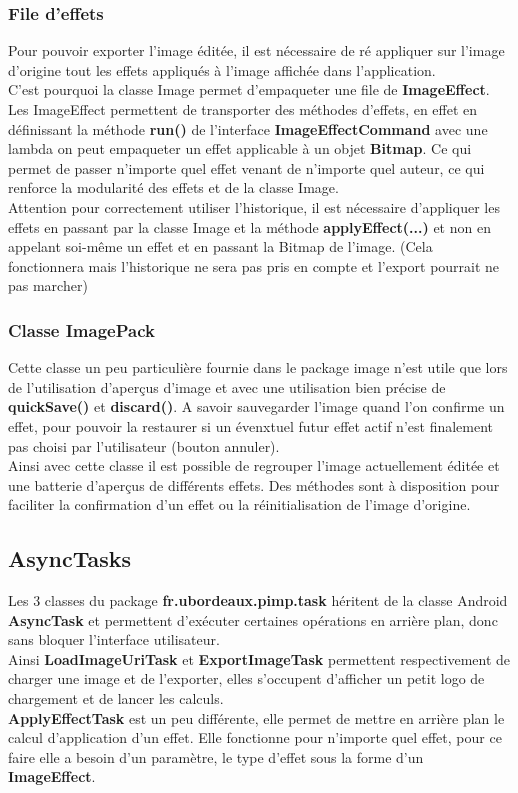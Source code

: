 \subsubsection{File d'effets} \label{file_effets}
Pour pouvoir exporter l'image éditée, il est nécessaire de ré appliquer sur l'image d'origine tout les effets appliqués à l'image affichée dans l'application.
\\
C'est pourquoi la classe Image permet d'empaqueter une file de \textbf{ImageEffect}. Les ImageEffect permettent de transporter des méthodes d'effets, en effet en définissant la méthode \textbf{run()} de l'interface \textbf{ImageEffectCommand} avec une lambda on peut empaqueter un effet applicable à un objet \textbf{Bitmap}. Ce qui permet de passer n'importe quel effet venant de n'importe quel auteur, ce qui renforce la modularité des effets et de la classe Image.
\\
Attention pour correctement utiliser l'historique, il est nécessaire d'appliquer les effets en passant par la classe Image et la méthode \textbf{applyEffect(...)} et non en appelant soi-même un effet et en passant la Bitmap de l'image. (Cela fonctionnera mais l'historique ne sera pas pris en compte et l'export pourrait ne pas marcher)

\subsubsection{Classe ImagePack}
Cette classe un peu particulière fournie dans le package image n'est utile que lors de l'utilisation d'aperçus d'image et avec une utilisation bien précise de \textbf{quickSave()} et \textbf{discard()}. A savoir sauvegarder l'image quand l'on confirme un effet, pour pouvoir la restaurer si un évenxtuel futur effet actif n'est finalement pas choisi par l'utilisateur (bouton annuler).
\\
Ainsi avec cette classe il est possible de regrouper l'image actuellement éditée et une batterie d'aperçus de différents effets. Des méthodes sont à disposition pour faciliter la confirmation d'un effet ou la réinitialisation de l'image d'origine.



\subsection{AsyncTasks}
Les 3 classes du package \textbf{fr.ubordeaux.pimp.task} héritent de la classe Android \textbf{AsyncTask} et permettent d'exécuter certaines opérations en arrière plan, donc sans bloquer l'interface utilisateur.
\\
Ainsi \textbf{LoadImageUriTask} et \textbf{ExportImageTask} permettent respectivement de charger une image et de l'exporter, elles s'occupent d'afficher un petit logo de chargement et de lancer les calculs.
\\
\textbf{ApplyEffectTask} est un peu différente, elle permet de mettre en arrière plan le calcul d'application d'un effet. Elle fonctionne pour n'importe quel effet, pour ce faire elle a besoin d'un paramètre, le type d'effet sous la forme d'un \textbf{ImageEffect}.

